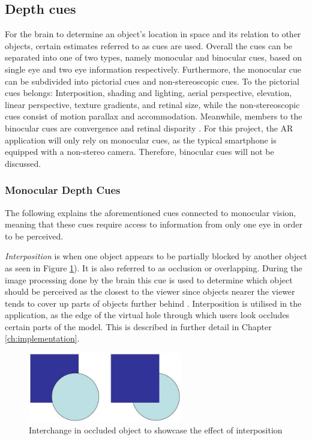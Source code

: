 \subsection{Depth cues}
For the brain to determine an object’s location in space and its relation to other objects, certain estimates referred to as cues are used. Overall the cues can be separated into one of two types, namely monocular and binocular cues, based on single eye and two eye information respectively. Furthermore, the monocular cue can be subdivided into pictorial cues and non-stereoscopic cues. To the pictorial cues belongs: Interposition, shading and lighting, aerial perspective, elevation, linear perspective, texture gradients, and retinal size, while the non-stereoscopic cues consist of motion parallax and accommodation. Meanwhile, members to the binocular cues are convergence and retinal disparity \cite{Gale}. For this project, the AR application will only rely on monocular cues, as the typical smartphone is equipped with a non-stereo camera. Therefore, binocular cues will not be discussed. 

\subsubsection{Monocular Depth Cues}
The following explains the aforementioned cues connected to monocular vision, meaning that these cues require access to information from only one eye in order to be perceived.

\textit{Interposition} is when one object appears to be partially blocked by another object as seen in Figure \ref{fig:cue0}). It is also referred to as occlusion or overlapping. During the image processing done by the brain this cue is used to determine which object should be perceived as the closest to the viewer since objects nearer the viewer tends to cover up parts of objects further behind \cite{Gale}. Interposition is utilised in the application, as the edge of the virtual hole through which users look occludes certain parts of the model. This is described in further detail in Chapter \ref{ch:implementation}.

\begin{figure}[h!]
   \centering
   \includegraphics[width=0.6\textwidth]{figures/cue0.jpg}
   \caption{Interchange in occluded object to showcase the effect of interposition \cite{Heeger}}\label{fig:cue0}
\end{figure}

